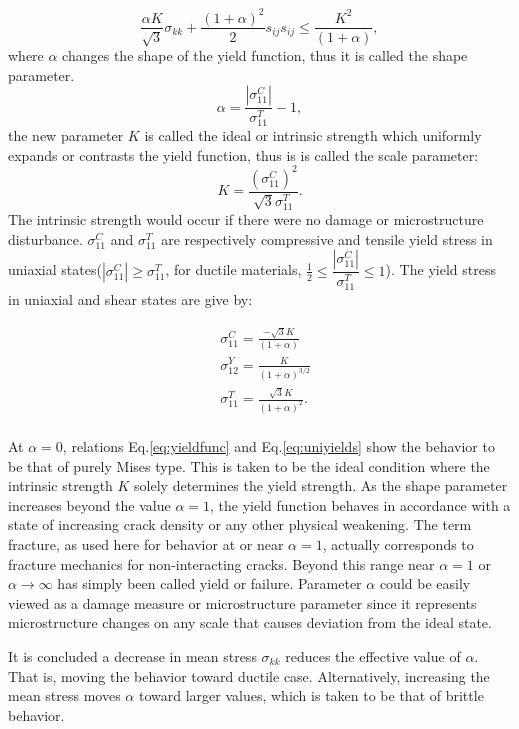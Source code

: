 \documentclass[3p,times,procedia,number]{elsarticle}
\begin{document}
\begin{equation}
	\frac{\alpha K}{\sqrt{3}}\sigma_{kk}+\frac{(1+\alpha)^2}{2}s_{ij}s_{ij}\leqslant\frac{K^2}{(1+\alpha)},
	\label{eq:yieldfunc}
\end{equation}
where $\alpha$ changes the shape of the yield function, thus it is called the shape parameter. 
$$\alpha=\frac{\left| \sigma_{11}^C\right| }{\sigma_{11}^T}-1,$$
the new parameter $K$ is called the ideal or intrinsic strength which uniformly expands or contrasts the yield function, thus is is called the scale parameter:
$$K=\frac{(\sigma_{11}^C)^2}{\sqrt{3}\sigma_{11}^T}.$$
The intrinsic strength would occur if there were no damage or microstructure disturbance. 
$\sigma_{11}^C$ and $\sigma_{11}^T$ are respectively compressive and tensile yield stress in uniaxial states($\left| \sigma_{11}^C\right| \geqslant\sigma_{11}^T$, for ductile materials, $\frac{1}{2}\leqslant\dfrac{\left| \sigma_{11}^C\right| }{\sigma_{11}^T}\leqslant 1$). The yield stress in uniaxial and shear states are give by:

\begin{equation}
	\begin{split}
		&\sigma_{11}^C=\frac{-\sqrt{3}K}{(1+\alpha)}\\
		&\sigma_{12}^Y=\frac{K}{(1+\alpha)^{3/2}} \\
		&\sigma_{11}^T=\frac{\sqrt{3}K}{(1+\alpha)^2}.\\
	\end{split}
	\label{eq:uniyields}
\end{equation}

At $\alpha=0$, relations Eq.\eqref{eq:yieldfunc} and Eq.\eqref{eq:uniyields} show the behavior to be that of purely Mises type. This is taken to be the ideal condition where the intrinsic strength $K$ solely determines the yield strength. As the shape parameter increases beyond the value $\alpha=1$, the yield function behaves in accordance with  a state of increasing crack density or any other physical weakening. The term fracture, as used here for behavior at or near $\alpha=1$, actually corresponds to fracture mechanics for non-interacting cracks. Beyond this range near $\alpha=1$ or $\alpha\to\infty$ has simply been called yield or failure. Parameter $\alpha$ could be easily viewed as a damage measure or microstructure parameter since it represents microstructure changes on any scale that causes deviation from the ideal state. 

It is concluded a decrease in mean stress $\sigma_{kk}$ reduces the effective value of $\alpha$. That is, moving the behavior toward ductile case. Alternatively, increasing the mean stress moves $\alpha$ toward larger values, which is taken to be that of brittle behavior.
\end{document}
